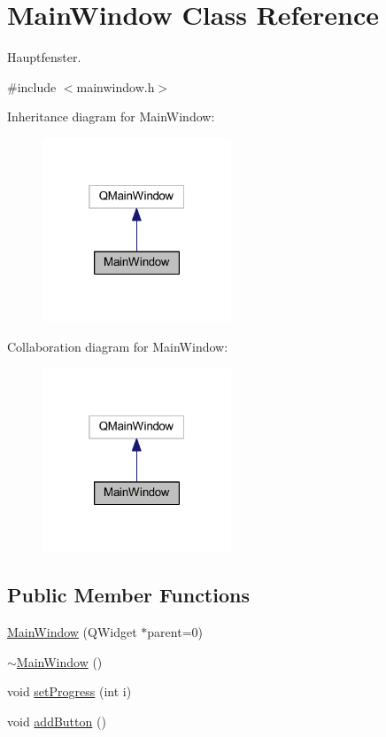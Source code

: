 \hypertarget{class_main_window}{}\section{Main\+Window Class Reference}
\label{class_main_window}


Hauptfenster.  




{\ttfamily \#include $<$mainwindow.\+h$>$}



Inheritance diagram for Main\+Window\+:\nopagebreak
\begin{figure}[H]
\begin{center}
\leavevmode
\includegraphics[width=160pt]{class_main_window__inherit__graph}
\end{center}
\end{figure}


Collaboration diagram for Main\+Window\+:\nopagebreak
\begin{figure}[H]
\begin{center}
\leavevmode
\includegraphics[width=160pt]{class_main_window__coll__graph}
\end{center}
\end{figure}
\subsection*{Public Member Functions}
\begin{DoxyCompactItemize}
\item 
\mbox{\hyperlink{class_main_window_a8b244be8b7b7db1b08de2a2acb9409db}{Main\+Window}} (Q\+Widget $\ast$parent=0)
\item 
\mbox{\hyperlink{class_main_window_ae98d00a93bc118200eeef9f9bba1dba7}{$\sim$\+Main\+Window}} ()
\item 
void \mbox{\hyperlink{class_main_window_ae576381be77310817278e79c978d1135}{set\+Progress}} (int i)
\item 
void \mbox{\hyperlink{class_main_window_a962b966d1e81982b7b9da86f0df0bbc1}{add\+Button}} ()
\end{DoxyCompactItemize}


